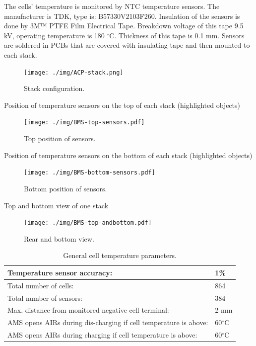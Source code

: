 The cells’ temperature is monitored by NTC temperature sensors. The manufacturer is TDK, type is: B57330V2103F260. Insulation of the sensors is done by 3M™ PTFE Film Electrical Tape. Breakdown voltage of this tape 9.5 kV, operating temperature is 180 $^\circ$C. Thickness of this tape is 0.1 mm. Sensors are soldered in PCBs that are covered with insulating tape and then mounted to each stack. 

\begin{figure}[H]
	\centering
	\texttt{[image: ./img/ACP-stack.png]}
	\caption{Stack configuration.}
	\label{fig:acp-stack}
\end{figure}

Position of temperature sensors on the top of each stack (highlighted objects)
\begin{figure}[H]
	\centering
	\texttt{[image: ./img/BMS-top-sensors.pdf]}
	\caption{Top position of sensors.}
	\label{fig:bms-top}
\end{figure}
Position of temperature sensors on the bottom of each stack (highlighted objects)
\begin{figure}[H]
	\centering
	\texttt{[image: ./img/BMS-bottom-sensors.pdf]}
	\caption{Bottom position of sensors.}
	\label{fig:bms-bottom}
\end{figure}
Top and bottom view of one stack 
\begin{figure}[H]
	\centering
	\texttt{[image: ./img/BMS-top-andbottom.pdf]}
	\caption{Rear and bottom view.}
	\label{fig:bms-top-and-bottom}
\end{figure}

\begin{table}[H]
	\centering
	\caption{General cell temperature parameters.}
	\begin{tabularx}{\textwidth}{|X|X|}
		\hline
		Temperature sensor accuracy: & 1\% \\[\TableSize]
		\hline
		Total number of cells: & 864 \\[\TableSize]
		\hline
		Total number of sensors: &  384 \\[\TableSize]
		\hline
		Max. distance from monitored negative cell terminal: & 2 mm \\[\TableSize]
		\hline
		AMS opens AIRs during dis-charging if cell temperature is above: & 60$^\circ$C \\[\TableSize]
		\hline
		AMS opens AIRs during charging if cell temperature is above: & 60$^\circ$C \\[\TableSize]
		\hline
	\end{tabularx}%
	\label{tab:acc-temp}%
\end{table}%

